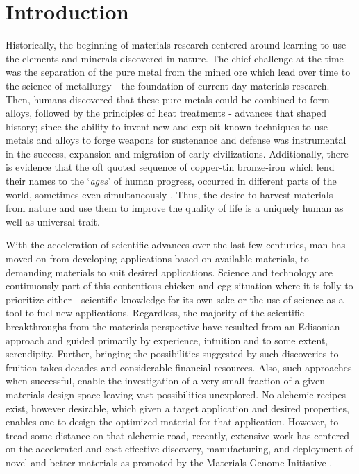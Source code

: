 \documentclass[utf8]{frontiersSCNS} %
\begin{document}
\section{Introduction}

 Historically, the beginning of materials research centered around learning to use the elements and minerals discovered in nature. The chief challenge at the time was the separation of  the pure metal from the mined ore which lead over time to the science of metallurgy - the foundation of current day materials research. Then, humans discovered that these pure metals could be combined to form alloys, followed by the principles of heat treatments - advances that shaped history; since the ability to invent new and exploit known techniques to use metals and alloys to forge weapons for sustenance and  defense  was instrumental in the success, expansion  and migration of early civilizations. Additionally, there is evidence that the oft quoted sequence of copper-tin bronze-iron which lend their names to the `\textit{ages}' of human progress, occurred in different parts of the world, sometimes even simultaneously \cite{tylecote1992history}. Thus, the desire to harvest materials from nature and use them to improve the quality of life is a uniquely human as well as universal trait. 

 With the acceleration of scientific advances over the last few centuries, man has moved on from developing applications based on available materials, to demanding materials to suit desired applications. Science and technology are continuously part of this contentious chicken and egg situation where it is folly to prioritize either  - scientific knowledge for its own sake or the use of science as a tool to fuel new applications. Regardless, the majority of the scientific breakthroughs from the materials perspective have resulted from an Edisonian approach and guided primarily by experience, intuition and to some extent, serendipity. Further, bringing the possibilities suggested by such discoveries to fruition takes decades and considerable financial resources. Also, such approaches when successful, enable the investigation of a very small fraction of a given materials design space leaving vast possibilities unexplored. No alchemic recipes exist, however desirable, which given a target application  and desired properties, enables one to design the optimized material for that application. However, to tread some distance on that alchemic road, recently, extensive work has centered on the accelerated and cost-effective discovery, manufacturing, and deployment of novel and better materials as promoted by the Materials Genome Initiative \cite{holdren2011materials}. 
 
\end{document}
